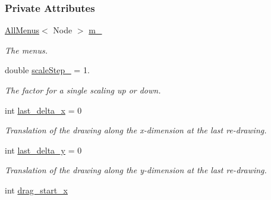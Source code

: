 \subsubsection*{Private Attributes}
\begin{DoxyCompactItemize}
\item 
\hyperlink{structslb_1_1core_1_1ui_1_1AllMenus}{All\+Menus}$<$ Node $>$ \hyperlink{structslb_1_1core_1_1ui_1_1Visualizer_ae9519808c0c17ec6f2944e744d832ddc}{m\+\_\+}\hypertarget{structslb_1_1core_1_1ui_1_1Visualizer_ae9519808c0c17ec6f2944e744d832ddc}{}\label{structslb_1_1core_1_1ui_1_1Visualizer_ae9519808c0c17ec6f2944e744d832ddc}

\begin{DoxyCompactList}\small\item\em The menus. \end{DoxyCompactList}\item 
double \hyperlink{structslb_1_1core_1_1ui_1_1Visualizer_a6d0d499e7d2d58673fe3da28a8338fe2}{scale\+Step\+\_\+} = 1.\hypertarget{structslb_1_1core_1_1ui_1_1Visualizer_a6d0d499e7d2d58673fe3da28a8338fe2}{}\label{structslb_1_1core_1_1ui_1_1Visualizer_a6d0d499e7d2d58673fe3da28a8338fe2}

\begin{DoxyCompactList}\small\item\em The factor for a single scaling up or down. \end{DoxyCompactList}\item 
int \hyperlink{structslb_1_1core_1_1ui_1_1Visualizer_a77fc447e8aecf4d7628f0d4b41824d53}{last\+\_\+delta\+\_\+x} = 0\hypertarget{structslb_1_1core_1_1ui_1_1Visualizer_a77fc447e8aecf4d7628f0d4b41824d53}{}\label{structslb_1_1core_1_1ui_1_1Visualizer_a77fc447e8aecf4d7628f0d4b41824d53}

\begin{DoxyCompactList}\small\item\em Translation of the drawing along the x-\/dimension at the last re-\/drawing. \end{DoxyCompactList}\item 
int \hyperlink{structslb_1_1core_1_1ui_1_1Visualizer_a76d9a405b1cccf41ad28eac18c8096d5}{last\+\_\+delta\+\_\+y} = 0\hypertarget{structslb_1_1core_1_1ui_1_1Visualizer_a76d9a405b1cccf41ad28eac18c8096d5}{}\label{structslb_1_1core_1_1ui_1_1Visualizer_a76d9a405b1cccf41ad28eac18c8096d5}

\begin{DoxyCompactList}\small\item\em Translation of the drawing along the y-\/dimension at the last re-\/drawing. \end{DoxyCompactList}\item 
int \hyperlink{structslb_1_1core_1_1ui_1_1Visualizer_aed879051d6889b0de1f25528e998967b}{drag\+\_\+start\+\_\+x}\hypertarget{structslb_1_1core_1_1ui_1_1Visualizer_aed879051d6889b0de1f25528e998967b}{}\label{structslb_1_1core_1_1ui_1_1Visualizer_aed879051d6889b0de1f25528e998967b}


\end{DoxyCompactItemize}
